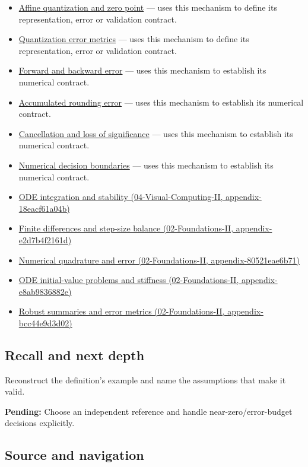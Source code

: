 \begin{itemize}
\item
  \hyperref[appendix-d5da3eaabaef]{Affine quantization and zero point} --- uses this mechanism to define its representation, error or validation contract.
\item
  \hyperref[appendix-537171d69d27]{Quantization error metrics} --- uses this mechanism to define its representation, error or validation contract.
\item
  \hyperref[appendix-a7fbaf6d1b1c]{Forward and backward error} --- uses this mechanism to establish its numerical contract.
\item
  \hyperref[appendix-f82e270791c8]{Accumulated rounding error} --- uses this mechanism to establish its numerical contract.
\item
  \hyperref[appendix-a2773a6a2f9d]{Cancellation and loss of significance} --- uses this mechanism to establish its numerical contract.
\item
  \hyperref[appendix-c80db39080be]{Numerical decision boundaries} --- uses this mechanism to establish its numerical contract.
\item
  \href{}{ODE integration and stability (04-Visual-Computing-II, appendix-18eacf61a04b)}
\item
  \href{}{Finite differences and step-size balance (02-Foundations-II, appendix-e2d7b4f2161d)}
\item
  \href{}{Numerical quadrature and error (02-Foundations-II, appendix-80521eae6b71)}
\item
  \href{}{ODE initial-value problems and stiffness (02-Foundations-II, appendix-e8ab9836882e)}
\item
  \href{}{Robust summaries and error metrics (02-Foundations-II, appendix-bcc44e9d3d02)}
\end{itemize}

\subsection{Recall and next depth}\label{recall-and-next-depth}

Reconstruct the definition's example and name the assumptions that make it valid.

\textbf{Pending:} Choose an independent reference and handle near-zero/error-budget decisions explicitly.

\subsection{Source and navigation}\label{source-and-navigation}

